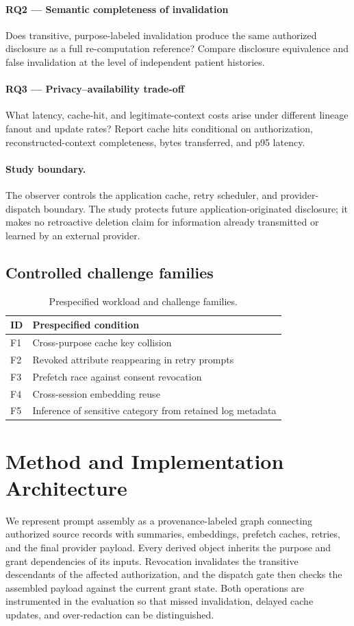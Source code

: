 \documentclass[11pt,a4paper]{article}
\begin{document}
\paragraph{RQ2 — Semantic completeness of invalidation} Does transitive, purpose-labeled invalidation produce the same authorized disclosure as a full re-computation reference? Compare disclosure equivalence and false invalidation at the level of independent patient histories.

\paragraph{RQ3 — Privacy–availability trade-off} What latency, cache-hit, and legitimate-context costs arise under different lineage fanout and update rates? Report cache hits conditional on authorization, reconstructed-context completeness, bytes transferred, and p95 latency.

\paragraph{Study boundary.} The observer controls the application cache, retry scheduler, and provider-dispatch boundary. The study protects future application-originated disclosure; it makes no retroactive deletion claim for information already transmitted or learned by an external provider.

\subsection{Controlled challenge families}
\begin{table}[ht]
\centering\small
\caption{Prespecified workload and challenge families.}
\begin{tabularx}{\linewidth}{@{}lX@{}}\toprule
ID & Prespecified condition \\ \midrule
F1 & Cross-purpose cache key collision \\ 
F2 & Revoked attribute reappearing in retry prompts \\ 
F3 & Prefetch race against consent revocation \\ 
F4 & Cross-session embedding reuse \\ 
F5 & Inference of sensitive category from retained log metadata \\ 
\bottomrule\end{tabularx}\end{table}

\section{Method and Implementation Architecture}
We represent prompt assembly as a provenance-labeled graph connecting authorized source records with summaries, embeddings, prefetch caches, retries, and the final provider payload. Every derived object inherits the purpose and grant dependencies of its inputs. Revocation invalidates the transitive descendants of the affected authorization, and the dispatch gate then checks the assembled payload against the current grant state. Both operations are instrumented in the evaluation so that missed invalidation, delayed cache updates, and over-redaction can be distinguished.
\end{document}
